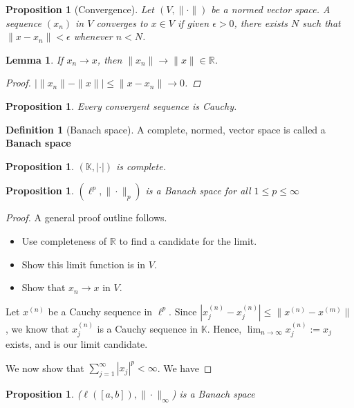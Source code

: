 \documentclass[10pt, oneside, reqno]{amsart}
\theoremstyle{plain}%
\newtheorem{lem}[thm]{Lemma}
\newtheorem{prop}[thm]{Proposition}
\theoremstyle{definition}
\newtheorem{defn}[thm]{Definition}
\theoremstyle{remark}
\newcommand{\R}{\mathbb{R}}
\newcommand{\K}{\mathbb{K}}
\begin{document}
\begin{prop}[Convergence] Let $(V, \| \cdot \| )$ be a normed vector space.  A sequence $(x_n)$ in $V$ converges to $x \in V$ if given $\epsilon > 0$, there exists $N$ such that $\| x - x_n \| < \epsilon$ whenever $n < N$. 
\end{prop}

\begin{lem}
    If $x_n \rightarrow x$, then $\| x_n \| \rightarrow \| x \| \in \R$.
    \begin{proof}
        $\left| \| x_n \| - \| x \| \right| \leq \| x - x_n \| \rightarrow 0$.
    \end{proof}
\end{lem}

\begin{prop}
    Every convergent sequence is Cauchy.
\end{prop}

\begin{defn}[Banach space]
A complete, normed, vector space is called a \textbf{Banach space}
\end{defn}

\begin{prop}
    $( \K, |\cdot |)$ is complete.
\end{prop}

\begin{prop}
    $(\ell^p, \| \cdot \|_p)$ is a Banach space for all $1 \leq p \leq \infty$
\end{prop}

\begin{proof}
    A general proof outline follows.
    \begin{itemize}
        \item Use completeness of $\R$ to find a candidate for the limit.
        \item Show this limit function is in $V$.
        \item Show that $x_n \rightarrow x$ in $V$.
    \end{itemize}
    Let $x^{(n)}$ be a Cauchy sequence in $\ell^p$.  Since $|x_j^{(n)} - x_{j}^{(n)}| \leq \|x^{(n)} - x^{(m)}\|$, we know that $x^{(n)}_j$ is a Cauchy sequence in $\K$.  Hence, $\lim_{n \rightarrow \infty} x^{(n)}_j := x_j$ exists, and is our limit candidate.
    
    We now show that $\sum_{j =1}^\infty |x_j|^p < \infty$.  We have 
\end{proof}

\begin{prop}
    ($\ell([a,b]), \|\cdot \|_\infty$) is a Banach space
\end{prop}
\end{document}
